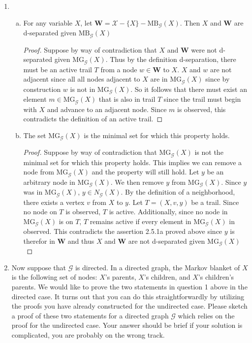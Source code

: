 \documentclass[12pt]{article}
\newcommand{\mg} {
\text{MG}_{\mathcal{G}}
}
\begin{document}
\begin{enumerate}[1.]	
	\item 
	\begin{enumerate}[(a)]
		\item For any variable $X$, let $\mathbf{W} = \mathcal{X} - \{X\} - \text{MB}_{\mathcal{G}}(X)$. Then $X$ and $\mathbf{W}$ are d-separated given $\text{MB}_{\mathcal{G}}(X)$
		\begin{proof}
		Suppose by way of contradiction that $X$ and $\mathbf{W}$ were not d-separated given $\text{MG}_{\mathcal{G}}(X)$. Thus by the definition d-separation, there must be an active trail $T$  from a node $w\in \mathbf{W}$ to $X$. $X$ and $w$ are not adjacent since all all nodes adjacent to $X$ are in $\text{MG}_{\mathcal{G}}(X)$ since by construction $w$ is not in $\text{MG}_{\mathcal{G}}(X)$. So it follows that there must exist an element $m \in \text{MG}_{\mathcal{G}}(X)$ that is also in trail $T$ since the trail must begin with $X$ and advance to an adjacent node. Since $m$ is observed, this contradicts the definition of an active trail.
		\end{proof}
	\item The set $\text{MG}_{\mathcal{G}}(X)$ is the minimal set for which this property holds. 
		\begin{proof}
		Suppose by way of contradiction that $\mg(X)$ is not the minimal set for which this property holds. This implies we can remove a node from $\mg(X)$ and the property will still hold. Let $y$ be an arbitrary node in $\mg(X)$. We then remove $y$ from $\mg(X)$. Since $y$ was in $\mg(X)$,  $y \in N_\mathcal{G}(X)$. By the definition of a neighborhood, there exists a vertex $v$ from $X$ to $y$.  Let $T = (X, v, y)$ be a trail. Since no node on $T$ is observed, $T$ is active. Additionally, since no node in $\mg(X)$ is on $T$, $T$ remains active if every element in $\mg(X)$ in observed. This contradicts the assertion 2.5.1a proved above since $y$ is therefor in $\mathbf{W}$ and thus $X$ and $\mathbf{W}$ are not d-separated given $\mg(X)$
		\end{proof}
	\end{enumerate}
	\item 
			Now suppose that $\mathcal{G}$ is directed. In a directed graph, the Markov blanket of $X$ is the following set of nodes: $X$'s parents, $X$'s children, and $X$'s children’s parents. We would like to prove the two statements in question 1 above in the directed case. It turns out that you can do this straightforwardly by utilizing the proofs you have already constructed for the undirected case. Please sketch a proof of these two statements for a directed graph $\mathcal{G}$ which relies on the proof for the undirected case. Your answer should be brief if your solution is complicated, you are probably on the wrong track.

\end{enumerate}
\end{document}
